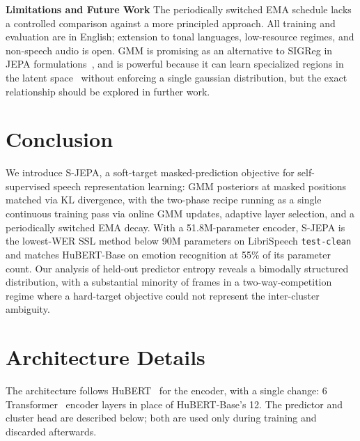 \documentclass[9pt,twocolumn]{article}
\theoremstyle{plain}
\theoremstyle{definition}
\theoremstyle{remark}
\begin{document}
\textbf{Limitations and Future Work}
\label{sec:limitations}
The periodically switched EMA schedule lacks a controlled comparison against a more principled approach. 
All training and evaluation are in English; extension to tonal languages, low-resource regimes, and non-speech audio is open. GMM is promising as an alternative to SIGReg in JEPA formulations~\citep{balestriero2025lejepa}, and is powerful because it can learn specialized regions in the latent space~\citep{goldfeder2026ai} without enforcing a single gaussian distribution, but the exact relationship should be explored in further work.


\section{Conclusion}

We introduce S-JEPA, a soft-target masked-prediction objective for self-supervised speech representation learning: GMM posteriors at masked positions matched via KL divergence, with the two-phase recipe running as a single continuous training pass via online GMM updates, adaptive layer selection, and a periodically switched EMA decay. With a 51.8M-parameter encoder, S-JEPA is the lowest-WER SSL method below 90M parameters on LibriSpeech \texttt{test-clean} and matches HuBERT-Base on emotion recognition at 55\% of its parameter count. Our analysis of held-out predictor entropy reveals a bimodally structured distribution, with a substantial minority of frames in a two-way-competition regime where a hard-target objective could not represent the inter-cluster ambiguity.








\newpage
\onecolumn
\appendix

\section{Architecture Details}
\label{app:arch}

The architecture follows HuBERT~\citep{hsu2021hubert} for the encoder, with a single change: 6 Transformer~\citep{vaswani2017attention} encoder layers in place of HuBERT-Base's 12. The predictor and cluster head are described below; both are used only during training and discarded afterwards.
\end{document}
